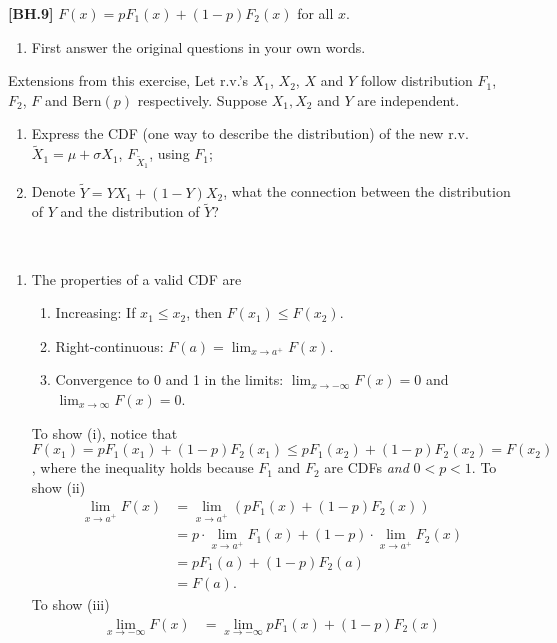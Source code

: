 \begin{exercise}
	\textbf{[BH.9]} $F(x) = p F_1(x)+ (1 - p) F_2(x)$ for all $x$.
	\begin{enumerate}
		\item First answer the original questions in your own words.
	\end{enumerate}
Extensions from this exercise, Let r.v.'s $X_1$, $X_2$, $X$ and $Y$ follow distribution $F_1$, $F_2$, $F$ and Bern$(p)$ respectively. Suppose $X_1,X_2$ and $Y$ are independent.
\begin{enumerate}
	\item Express the CDF (one way to describe the distribution) of the new r.v. $\tilde{X}_1=\mu+ \sigma X_1$, $F_{\tilde{X}_1}$, using $F_1$;
	\item Denote $\tilde{Y}=YX_1+(1-Y)X_2$, what the connection between the distribution of $Y$ and the distribution of $\tilde{Y}$?
\end{enumerate}
	\begin{solution}~
		\begin{enumerate}
			\item The properties of a valid CDF are
			\begin{enumerate}
				\item Increasing: If $x_{1}\leq x_{2}$, then $F(x_{1})\leq F(x_{2})$.
				\item Right-continuous: $F(a)=\lim_{x\rightarrow a^{+}} F(x)$.
				\item Convergence to 0 and 1 in the limits: $\lim_{x\rightarrow-\infty}F(x)=0$ and $\lim_{x\rightarrow\infty}F(x)=0$.
			\end{enumerate}
			To show (i), notice that $F(x_{1})= pF_{1}(x_{1}) + (1-p)F_{2}(x_{1})\leq  pF_{1}(x_{2}) + (1-p)F_{2}(x_{2})=F(x_{2})$, where the inequality holds because $F_{1}$ and $F_{2}$ are CDFs \textit{and} $0<p<1$. 
			To show (ii) 
			\begin{align*}
				\lim_{x\rightarrow a^{+}} F(x) &= \lim_{x\rightarrow a^{+}}(pF_1(x) + (1-p)F_{2}(x))\\
				&= p\cdot \lim_{x\rightarrow a^{+}}F_1(x) + (1-p)\cdot \lim_{x\rightarrow a^{+}}F_{2}(x)\tag*{(Algebraic Limit Theorem)}\\
				& = p F_1(a) + (1-p)F_{2}(a)\\
				& = F(a).
			\end{align*}
			To show (iii)
			\begin{align*}
				\lim_{x\rightarrow-\infty}F(x)& = \lim_{x\rightarrow-\infty} pF_1(x) + (1-p)F_{2}(x)\\

\end{align*}
\end{enumerate}
\end{solution}
\end{exercise}
